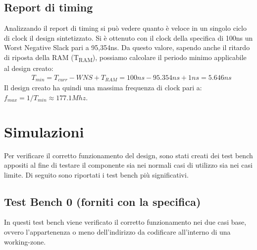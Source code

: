 \documentclass{article}
\begin{document}
\subsection{Report di timing}
Analizzando il report di timing si può vedere quanto è veloce in un singolo ciclo di clock il design sintetizzato. Si è ottenuto con il clock della specifica di 100ns un Worst Negative Slack pari a 95,354ns. Da questo valore, sapendo anche il ritardo di riposta della RAM (T\textsubscript{RAM}), possiamo calcolare il periodo minimo applicabile al design creato:
\begin{align*}
    &T_{min} = T_{curr} - \mathit{WNS} + T_{RAM} = 100ns - 95.354ns + 1ns = 5.646ns
\end{align*}
Il design creato ha quindi una massima frequenza di clock pari a: \( f_{max} = 1/T_{min} \approx 177.1 \mathit{Mhz} \).\\

\vspace{4mm}
\titlerule[0.4pt]


\pagebreak
\section{Simulazioni}
Per verificare il corretto funzionamento del design, sono stati creati dei test bench appositi al fine di testare il componente sia nei normali casi di utilizzo sia nei casi limite. Di seguito sono riportati i test bench più significativi.

\subsection{Test Bench 0 (forniti con la specifica)}
In questi test bench viene verificato il corretto funzionamento nei due casi base, ovvero l'appartenenza o meno dell'indirizzo da codificare all'interno di una working-zone.
\end{document}

